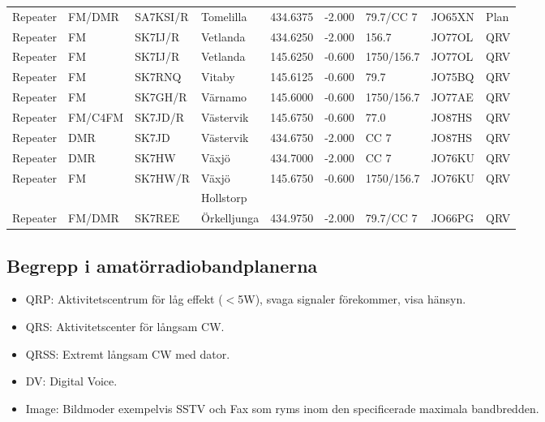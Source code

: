 \begin{landscape}
\begin{longtable}{llllrrlll}
Repeater & FM/DMR          & SA7KSI/R & Tomelilla    & 434.6375     & -2.000     & 79.7/CC 7    & JO65XN      & Plan     \\
Repeater & FM              & SK7IJ/R  & Vetlanda     & 434.6250     & -2.000     & 156.7        & JO77OL      & QRV      \\
Repeater & FM              & SK7IJ/R  & Vetlanda     & 145.6250     & -0.600     & 1750/156.7   & JO77OL      & QRV      \\
Repeater & FM              & SK7RNQ   & Vitaby       & 145.6125     & -0.600     & 79.7         & JO75BQ      & QRV      \\
Repeater & FM              & SK7GH/R  & Värnamo      & 145.6000     & -0.600     & 1750/156.7   & JO77AE      & QRV      \\
Repeater & FM/C4FM         & SK7JD/R  & Västervik    & 145.6750     & -0.600     & 77.0         & JO87HS      & QRV      \\
Repeater & DMR             & SK7JD    & Västervik    & 434.6750     & -2.000     & CC 7         & JO87HS      & QRV      \\
Repeater & DMR             & SK7HW    & Växjö        & 434.7000     & -2.000     & CC 7         & JO76KU      & QRV      \\
Repeater & FM              & SK7HW/R  & Växjö        & 145.6750     & -0.600     & 1750/156.7   & JO76KU      & QRV      \\
         &                 &          & Hollstorp    &              &            &              &             &          \\
Repeater & FM/DMR          & SK7REE   & Örkelljunga  & 434.9750     & -2.000     & 79.7/CC 7    & JO66PG      & QRV      \\
\end{longtable}


\end{landscape}


\clearpage

\subsection{Begrepp i amatörradiobandplanerna}

\begin{itemize}
\item QRP: Aktivitetscentrum för låg effekt ($<$5W), svaga signaler
      förekommer, visa hänsyn.
\item QRS: Aktivitetscenter för långsam CW.
\item QRSS: Extremt långsam CW med dator.
\item DV: Digital Voice.
\item Image: Bildmoder exempelvis SSTV och Fax som ryms inom den specificerade
	  maximala bandbredden.
\end{itemize}

